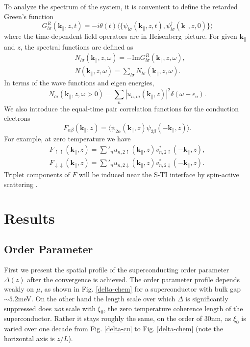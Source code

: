 \documentclass[12pt,twocolumn]{article}
\newcommand{\kperp}{\mathbf{k}_\parallel}
\begin{document}
To analyze the spectrum of the system, it is convenient to define the retarded Green's function
\begin{equation}
G^R_{l\sigma}(\mathbf{k}_\parallel,z,t)=-i\theta(t)\langle \{\psi_{l\sigma}(\mathbf{k}_\parallel,z,t),
\psi^\dagger_{l\sigma}(\mathbf{k}_\parallel,z,0)\}\rangle
\end{equation}
where the time-dependent field operators are in Heisenberg picture. 
For given $\kperp$ and $z$, the spectral functions 
are defined as
\begin{eqnarray}
&N_{l\sigma}(\mathbf{k}_\parallel,z,\omega)= -\mathrm{Im}G^R_{l\sigma}(\mathbf{k}_\parallel,z,\omega), \\
&N(\mathbf{k}_\parallel,z,\omega)=\sum_{l\sigma}N_{l\sigma}(\mathbf{k}_\parallel,z,\omega).
\end{eqnarray}
In terms of the wave functions and eigen energies, 
\begin{equation}
N_{l\sigma}(\mathbf{k}_\parallel,z,\omega>0)=\sum_n|u_{n,l\sigma}(\mathbf{k}_\parallel,z)|^2\delta(\omega-\epsilon_n). 
\end{equation}
We also introduce the equal-time pair correlation functions
for the conduction electrons 
\begin{equation}
F_{\alpha\beta}(\mathbf{k}_\parallel,z)=\langle \psi_{2\alpha}(\mathbf{k}_\parallel,z) \psi_{2\beta}(-\mathbf{k}_\parallel,z)\rangle.\label{pair-corr}
\end{equation}
For example, at zero temperature we have
\begin{eqnarray}
F_{\uparrow\uparrow}(\mathbf{k}_\parallel,z)=\sum'_n u_{n,2\uparrow}(\mathbf{k}_\parallel,z)
v^*_{n,2\uparrow}(-\mathbf{k}_\parallel,z),\\
F_{\downarrow\downarrow}(\mathbf{k}_\parallel,z)=\sum'_n u_{n,2\downarrow}(\mathbf{k}_\parallel,z)
v^*_{n,2\downarrow}(-\mathbf{k}_\parallel,z).
\end{eqnarray}
Triplet components of $F$ will be induced near the S-TI interface by spin-active
scattering \cite{zhao}.

\section{Results}


\subsection{Order Parameter}

First we present the spatial profile of the superconducting order parameter $\Delta(z)$ after the convergence is achieved. 
The order parameter profile depends weakly on $\mu$, as shown in Fig. \ref{delta-chem} for a superconductor with bulk gap $\sim 5.2$meV. On the other hand the length scale over which $\Delta$ is significantly suppressed does {\it not} scale with $\xi_0$, the zero temperature coherence length of the superconductor. Rather it stays roughly the same, on the order of $30$nm, as $\xi_0$ is varied over one decade from Fig. \ref{delta-cu}
to Fig. \ref{delta-chem} (note the horizontal axis is $z/L$). 
\end{document}
